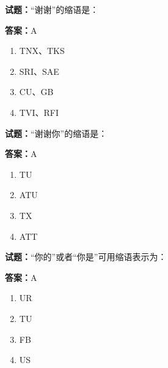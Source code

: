 \documentclass{ctexbook}
\begin{document}




\vspace{1em}

\textbf{试题：}“谢谢”的缩语是： 

\textbf{答案：}A 

\begin{enumerate}[leftmargin=3em]
  \item TNX、TKS 

  \item SRI、SAE 

  \item CU、GB 

  \item TVI、RFI 

\end{enumerate}





\vspace{1em}

\textbf{试题：}“谢谢你”的缩语是： 

\textbf{答案：}A 

\begin{enumerate}[leftmargin=3em]
  \item TU 

  \item ATU 

  \item TX 

  \item ATT 

\end{enumerate}





\vspace{1em}

\textbf{试题：}“你的”或者“你是”可用缩语表示为： 

\textbf{答案：}A 

\begin{enumerate}[leftmargin=3em]
  \item UR 

  \item TU 

  \item FB 

  \item US 

\end{enumerate}
\end{document}
